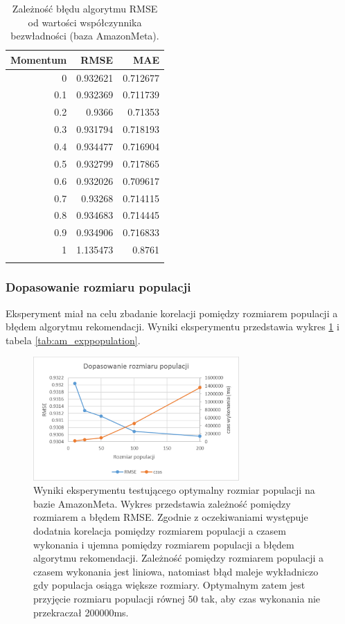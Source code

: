 \documentclass[twoside]{iisthesis}
\begin{document}
			\begin{longtable}{r||rr}
				\label{tab:am_expmomentum}
				\textbf{Momentum} & \textbf{RMSE} & \textbf{MAE} \\
				\hline
				0   & 0.932621 & 0.712677 \\
				0.1 & 0.932369 & 0.711739 \\
				0.2 & 0.9366   & 0.71353  \\
				0.3 & 0.931794 & 0.718193 \\
				0.4 & 0.934477 & 0.716904 \\
				0.5 & 0.932799 & 0.717865 \\
				0.6 & 0.932026 & 0.709617 \\
				0.7 & 0.93268  & 0.714115 \\
				0.8 & 0.934683 & 0.714445 \\
				0.9 & 0.934906 & 0.716833 \\
				1   & 1.135473 & 0.8761   \\
				\caption{Zależność błędu algorytmu RMSE od wartości współczynnika bezwładności (baza AmazonMeta).}
			\end{longtable}
			
			\subsubsection{Dopasowanie rozmiaru populacji}
			
			 Eksperyment miał na celu zbadanie korelacji pomiędzy rozmiarem populacji a błędem algorytmu rekomendacji. Wyniki eksperymentu przedstawia wykres \ref{fig:am_exppopulation} i tabela \ref{tab:am_exppopulation}. 
			 
			 \begin{figure}[!ht]
			 	\centering
			 	\includegraphics[width=0.7\textwidth]{am_exppopulation}
			 	\caption{Wyniki eksperymentu testującego optymalny rozmiar populacji na bazie AmazonMeta. Wykres przedstawia zależność pomiędzy rozmiarem a błędem RMSE. 
		 		Zgodnie z oczekiwaniami występuje dodatnia korelacja pomiędzy rozmiarem populacji a czasem wykonania i ujemna pomiędzy rozmiarem populacji a błędem algorytmu rekomendacji. 
		 		Zależność pomiędzy rozmiarem populacji a czasem wykonania  jest liniowa, natomiast błąd maleje wykładniczo gdy populacja osiąga większe rozmiary. Optymalnym zatem jest przyjęcie rozmiaru populacji równej $50$ tak, aby czas wykonania nie przekraczał 200000ms.}
			 	\label{fig:am_exppopulation}
			 \end{figure}
			
\end{document}
